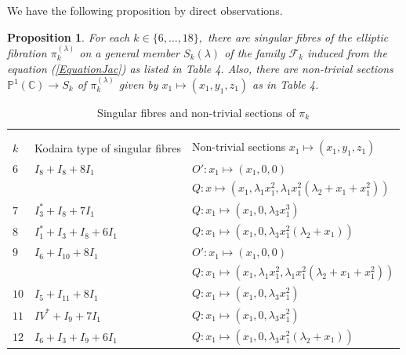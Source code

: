\documentclass[10pt]{article}
\newtheorem{prop}{Proposition}[section]
\begin{document}
We have the following proposition by direct observations.


\begin{prop}
For each $k\in \{6,\ldots,18\},$
there are singular fibres of the elliptic fibration $\pi_k^{(\lambda)}$ on a  general member $S_k(\lambda)$ of the family $\mathscr{F}_k$ induced from the equation (\ref{EquationJac})
as listed in Table 4.
Also, there are non-trivial sections $\mathbb{P}^1 (\mathbb{C}) \rightarrow S_k$ of $\pi_k^{(\lambda)}$ given by $x_1 \mapsto (x_1,y_1,z_1)$  as in Table 4. 
\end{prop}


{\small
\begin{longtable}{lll}
  \caption{\normalsize{Singular fibres and non-trivial sections  of  $\pi_k$ }}
  \vspace{-5.5mm}\\
  \\
\hline
  $k$ & Kodaira type of singular fibres &  Non-trivial sections   $x_1 \mapsto (x_1,y_1,z_1)$   
    \\
  \hline
  \endhead
\vspace{1mm}$6$ &$I_8 + I_8 +8 I_1$ & $O': x_1\mapsto (x_1,0,0)$   \\
\vspace{1mm} & & $Q: x\mapsto (x_1,\lambda_1 x_1^2,\lambda_1 x_1^2 (\lambda_2 + x_1 +x_1^2))$\\
\vspace{1mm}$7$ & $I_3^*  +I_8 +7 I_1$ & $Q: x_1\mapsto (x_1,0,\lambda_3 x_1^3)$   \\
\vspace{1mm}$8$  & $I_1^* + I_3 + I_8 + 6 I_1$  & $Q: x_1\mapsto (x_1,0,\lambda_3 x_1^2 (\lambda_2+x_1) )$   \\
\vspace{1mm}$9$ & $I_6 + I_{10} +8 I_1$ & $O': x_1\mapsto (x_1,0,0)$   \\
\vspace{1mm}&&  $Q: x_1\mapsto (x_1,\lambda_1 x_1^2,\lambda_1 x_1^2 (\lambda_2+x_1 + x_1^2))$ \\
\vspace{1mm}$10$  & $I_5 +I_{11}+8 I_1$ & $Q: x_1\mapsto (x_1,0,\lambda_3  x_1^2)$   \\
\vspace{1mm}$11$ &$IV^* + I_9 + 7 I_1$ & $Q: x_1\mapsto (x_1,0,\lambda_3  x_1^2)$   \\
\vspace{1mm}$12$ &$I_6 + I_3 + I_9 + 6 I_1$ & $Q: x_1\mapsto (x_1,0,\lambda_3  x_1^2 (\lambda_2+x_1))$   \\

\end{longtable}}
\end{document}
